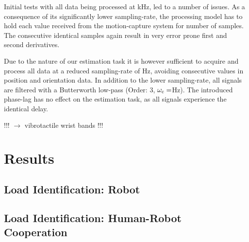 Initial tests with all data being processed at \unit[1]{kHz}, led to a number of issues. As a consequence of its significantly lower sampling-rate, the processing model has to hold each value received from the motion-capture system for number of samples.  The consecutive identical samples again result in very error prone first
and second derivatives.

Due to the nature of our estimation task it is however sufficient to acquire and process all data at a reduced sampling-rate of \unit[100]{Hz}, avoiding consecutive values in position and orientation data. In addition to the lower sampling-rate, all signals are filtered with a Butterworth low-pass (Order: 3, $\omega_{\mathrm{c}} = $\unit[30]{Hz}). The introduced phase-lag has no effect on the estimation task, as all signals experience the identical delay.

!!! $\longrightarrow$ vibrotactile wrist bands !!!

\section{Results}
\subsection{Load Identification: Robot}
\subsection{Load Identification: Human-Robot Cooperation}
